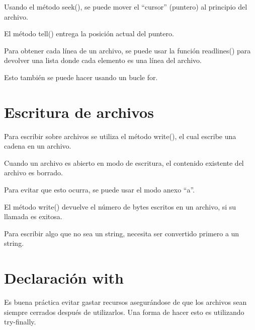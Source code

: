 \documentclass{report}
\newcommand{\doble}[1]{``#1''}
\begin{document}

Usando el método seek(), se puede mover el \doble{cursor} (puntero) al principio del archivo.


El método tell() entrega la posición actual del puntero.


Para obtener cada línea de un archivo, se puede usar la función readlines() para devolver una lista donde cada elemento es una línea del archivo.


Esto también se puede hacer usando un bucle for.


\section{Escritura de archivos}

Para escribir sobre archivos se utiliza el método write(), el cual escribe una cadena en un archivo.


Cuando un archivo es abierto en modo de escritura, el contenido existente del archivo es borrado.


Para evitar que esto ocurra, se puede usar el modo anexo \doble{a}.


El método write() devuelve el número de bytes escritos en un archivo, si su llamada es exitosa.


Para escribir algo que no sea un string, necesita ser convertido primero a un string.


\section{Declaración with}

Es buena práctica evitar gastar recursos asegurándose de que los archivos sean siempre cerrados después de utilizarlos. Una forma de hacer esto es utilizando try-finally.
\end{document}
